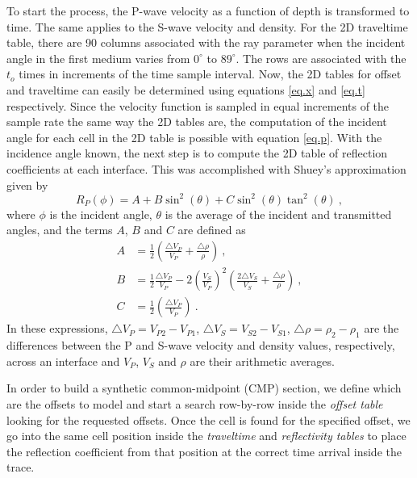 \documentclass{vie16}
\begin{document}
To start the process, the P-wave velocity as a function of depth
is transformed to time. The same applies to the S-wave velocity
and density. For the 2D traveltime table, there are 90 columns
associated with the ray parameter when the incident angle in the
first medium varies from $0^{\circ}$ to $89^{\circ}$. The rows are
associated with the $t_{o}$ times in increments of the time
sample interval. Now, the 2D tables for offset and traveltime
can easily be determined using equations \ref{eq.x} and
\ref{eq.t} respectively. Since the velocity function is sampled
in equal increments of the sample rate the same way the 2D
tables are, the computation of the incident angle for each cell
in the 2D table is possible with equation \ref{eq.p}. With the
incidence angle known, the next step is to compute the 2D table
of reflection coefficients at each interface. This was
accomplished with Shuey's approximation \citep{Shuey1985} given by
\begin{equation}
R_{P} (\phi) = A + B\sin^{2}(\theta) + C\sin^{2}(\theta)\tan^{2}(\theta)
\ , \label{eq.shuey}
\end{equation}
where $\phi$ is the incident angle, $\theta$ is the average of
the incident and transmitted angles, and the terms $A$, $B$ and
$C$ are defined as
\begin{equation}
\begin{split}
A & = \frac{1}{2} \left(\frac{\triangle V_{P}}{V_{P}}     +
\frac{\triangle \rho}{\rho}     \right)\ , \\
B & = \frac{1}{2} \frac{\triangle V_{P}}{V_{P}}  - 2\left(\frac{
V_{S}}{V_{P}}\right)^{2}  \left(\frac{2\triangle V_{S}}{V_{S}} +
\frac{\triangle \rho}{\rho}\right)   \ , \\
C & = \frac{1}{2} \left(\frac{\triangle V_{P}}{V_{P}} \right) \ .
\end{split}
\end{equation}
In these expressions, $\triangle V_{P} = V_{P2} - V_{P1}$,
$\triangle V_{S} = V_{S2} - V_{S1}$, $\triangle \rho = \rho_{2}
- \rho_{1}$ are the differences between the P and S-wave velocity and
density values, respectively, across an interface and $V_{P}$, $V_{S}$
and $\rho$ are their arithmetic averages.

In order to build a synthetic common-midpoint (CMP) section,
we define which are the offsets to model and start a
search row-by-row inside the \textit{offset table} looking for
the requested offsets.  Once the cell is found for the specified
offset, we go into the same cell position inside the
\textit{traveltime} and \textit{reflectivity tables} to place
the reflection coefficient from that position at the correct
time arrival inside the trace.
\end{document}
